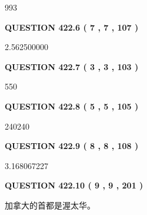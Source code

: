 \documentclass{ctexart}
\begin{document}
  
 
 
\noindent{}

993
 
 
  
\vspace{0.2in}
  
{\textbf{\Large{QUESTION
422.6 
 ( 7 , 7 , 107 )
}}}
  
  
 
 
\noindent{}

2.562500000
 
 
  
\vspace{0.2in}
  
{\textbf{\Large{QUESTION
422.7 
 ( 3 , 3 , 103 )
}}}
  
  
 
 
\noindent{}

550
 
 
  
\vspace{0.2in}
  
{\textbf{\Large{QUESTION
422.8 
 ( 5 , 5 , 105 )
}}}
  
  
 
 
\noindent{}

240240
 
 
  
\vspace{0.2in}
  
{\textbf{\Large{QUESTION
422.9 
 ( 8 , 8 , 108 )
}}}
  
  
 
 
\noindent{}

3.168067227
 
 
  
\vspace{0.2in}
  
{\textbf{\Large{QUESTION
422.10 
 ( 9 , 9 , 201 )
}}}
  
  
 
 
\noindent{}
 
 
加拿大的首都是渥太华。
 
\end{document}
